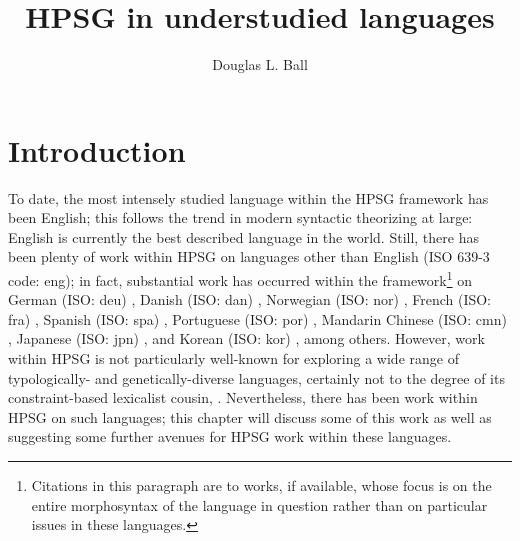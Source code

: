 \documentclass[output=paper
	        ,collection
	        ,collectionchapter
 	        ,biblatex
                ,babelshorthands
                ,newtxmath
                ,draftmode
                ,colorlinks, citecolor=brown
]{langscibook}
\title{HPSG in understudied languages}
\author{%
	Douglas L. Ball\affiliation{Truman State University}%
}
\begin{document}
\maketitle
\label{understudied-languages}


\section{Introduction}

To date, the most intensely studied language within the HPSG framework has been English; this follows the trend in modern syntactic theorizing at large: English is currently the best described language in the world. Still, there has been plenty of work within HPSG on languages other than English (ISO 639-3 code: eng); in fact, substantial work has occurred within the framework\footnote{Citations in this paragraph are  to works, if available, whose focus is on the entire morphosyntax of the language in question rather than on particular issues in these languages.} on 
German (ISO: deu) \citep{Crysmann2003b,MuellerLehrbuch3}, 
Danish (ISO: dan) \citep{MOeDanish}, 
Norwegian (ISO: nor) \citep{HH2004a-u}, 
French (ISO: fra) \citep{AG2000a,AG2002b-u,abegod04,ABGT2006a-u}, 
Spanish (ISO: spa) \citep{Marimon2013a-u}, 
Portuguese (ISO: por) \citep{BC2008a-u}, 
Mandarin Chinese (ISO: cmn) \citep{ML2013a,MLChinese,YF2014a-u}, 
Japanese (ISO: jpn) \citep{SBB2016a}, and 
Korean (ISO: kor) \citep{KYSB2011a-u}, among others. However, work within HPSG is not particularly well-known for exploring a wide range of typologically- and genetically-diverse languages, certainly not to the degree of its constraint-based lexicalist cousin, . Nevertheless, there has been work within HPSG on such languages; this chapter will discuss some of this work as well as suggesting some further avenues for HPSG work within these languages.
\end{document}
